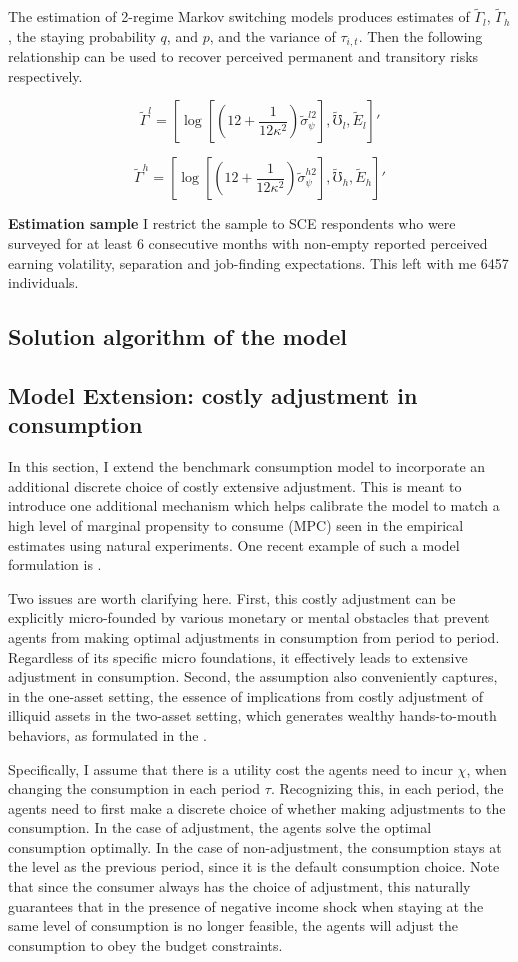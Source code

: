 The estimation of 2-regime Markov switching models produces estimates of $\tilde \Gamma_l$, $\tilde \Gamma_h$, the staying probability $q$, and $p$, and the variance of $\tau_{i,t}$. Then the following relationship can be used to recover perceived permanent and transitory risks respectively. 

$$\tilde \Gamma^l=[\log[(12+\frac{1}{12\kappa^2})\tilde \sigma^{l2}_{\psi}],\tilde \mho_l,\tilde E_l]'$$

$$\tilde \Gamma^h = [\log[(12+\frac{1}{12\kappa^2})\tilde \sigma^{h2}_{\psi}],\tilde \mho_h,\tilde E_h]'$$

\textbf{Estimation sample} I restrict the sample to SCE respondents who were surveyed for at least 6 consecutive months with non-empty reported perceived earning volatility, separation and job-finding expectations. This left with me 6457 individuals.

\subsection{Solution algorithm of the model} 


\subsection{Model Extension: costly adjustment in consumption}

In this section, I extend the benchmark consumption model to incorporate an additional discrete choice of costly extensive adjustment. This is meant to introduce one additional mechanism which helps calibrate the model to match a high level of marginal propensity to consume (MPC) seen in the empirical estimates using natural experiments. One recent example of such a model formulation is \cite{fuster2021would}. 

Two issues are worth clarifying here. First, this costly adjustment can be explicitly micro-founded by various monetary or mental obstacles that prevent agents from making optimal adjustments in consumption from period to period. Regardless of its specific micro foundations, it effectively leads to extensive adjustment in consumption. Second, the assumption also conveniently captures, in the one-asset setting, the essence of implications from costly adjustment of illiquid assets in the two-asset setting, which generates wealthy hands-to-mouth behaviors, as formulated in the \citep{kaplan2014model}. 


Specifically, I assume that there is a utility cost the agents need to incur $\chi$, when changing the consumption in each period $\tau$. Recognizing this, in each period, the agents need to first make a discrete choice of whether making adjustments to the consumption. In the case of adjustment, the agents solve the optimal consumption optimally. In the case of non-adjustment, the consumption stays at the level as the previous period, since it is the default consumption choice. Note that since the consumer always has the choice of adjustment, this naturally guarantees that in the presence of negative income shock when staying at the same level of consumption is no longer feasible, the agents will adjust the consumption to obey the budget constraints. 

